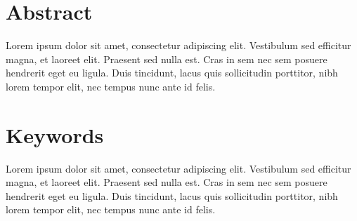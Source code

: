 \thispagestyle{plain}

\section*{Abstract}
\label{sec:abstract}


Lorem ipsum dolor sit amet, consectetur adipiscing elit. Vestibulum sed efficitur magna, et laoreet elit. Praesent sed nulla est. Cras in sem nec sem posuere hendrerit eget eu ligula. Duis tincidunt, lacus quis sollicitudin porttitor, nibh lorem tempor elit, nec tempus nunc ante id felis.




\section*{Keywords}
\label{sec:keywords}

Lorem ipsum dolor sit amet, consectetur adipiscing elit. Vestibulum sed efficitur magna, et laoreet elit. Praesent sed nulla est. Cras in sem nec sem posuere hendrerit eget eu ligula. Duis tincidunt, lacus quis sollicitudin porttitor, nibh lorem tempor elit, nec tempus nunc ante id felis. 
